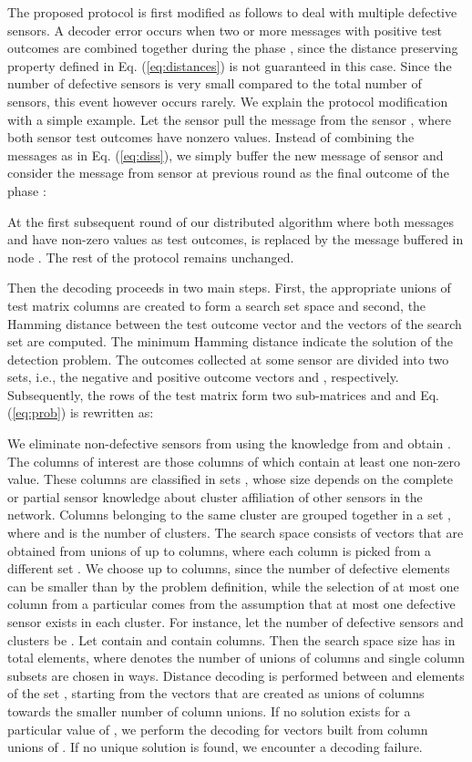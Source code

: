 \documentclass[journal]{IEEEtran}
\begin{document}
The proposed protocol is first modified as follows to deal with multiple defective sensors. A decoder error occurs when two or more messages with positive test outcomes are combined together during the phase , since the distance preserving property defined in Eq. (\ref{eq:distances}) is not guaranteed in this case. Since the number of defective sensors is very small compared to the total number of sensors, this event however occurs rarely. We explain the protocol modification with a simple example. Let the sensor  pull the message from the sensor , where both sensor test outcomes have nonzero values. Instead of combining the messages as in Eq. (\ref{eq:diss}), we simply buffer the new message of sensor  and consider the message from sensor  at previous round as the final outcome of the phase :

At the first subsequent round  of our distributed algorithm where both messages  and  have non-zero values as test outcomes,  is replaced by the message buffered in node . The rest of the protocol remains unchanged. 

Then the decoding proceeds in two main steps. First, the appropriate unions of test matrix columns are created to form a search set space and second, the Hamming distance between the test outcome vector and the vectors of the search set are computed. The minimum Hamming distance indicate the solution of the detection problem. The outcomes  collected at some sensor are divided into two sets, i.e., the negative and positive outcome vectors  and , respectively. Subsequently, the rows of the test matrix  form two sub-matrices  and  and Eq. (\ref{eq:prob}) is rewritten as:

We eliminate non-defective sensors from  using the knowledge from  and obtain . The columns of interest are those columns of  which contain at least one non-zero value. These columns are classified in sets , whose size depends on the complete or partial sensor knowledge about cluster affiliation of other sensors in the network. Columns belonging to the same cluster are grouped together in a set , where  and  is the number of clusters. The search space  consists of vectors that are obtained from unions of up to  columns, where each column is picked from a different set . We choose up to  columns, since the number of defective elements can be smaller than  by the problem definition, while the selection of at most one column from a particular  comes from the assumption that at most one defective sensor exists in each cluster. For instance, let the number of defective sensors and clusters be . Let  contain  and  contain  columns. Then the search space size has in total  elements, where  denotes the number of unions of  columns and single column subsets are chosen in  ways. Distance decoding is performed between  and elements of the set , starting from the vectors that are created as unions of  columns towards the smaller number of column unions. If no solution exists for a particular value of , we perform the decoding for vectors built from  column unions of . If no unique solution is found, we encounter a decoding failure. 
\end{document}
